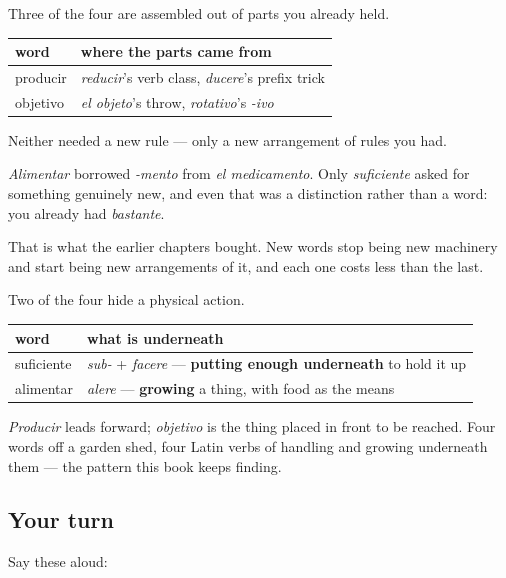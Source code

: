 \begin{grammarlens}[title={Grammar Lens: what this chapter actually cost you}]
Three of the four are assembled out of parts you already held.

\noindent
\begin{tabularx}{\linewidth}{@{}>{\raggedright\arraybackslash}X>{\raggedright\arraybackslash}X@{}}
\toprule
\textbf{word} & \textbf{where the parts came from} \\
\midrule
producir & \emph{reducir}'s verb class, \emph{ducere}'s prefix trick \\
objetivo & \emph{el objeto}'s throw, \emph{rotativo}'s \emph{-ivo} \\
\bottomrule
\end{tabularx}

Neither needed a new rule — only a new arrangement of rules you had.

\emph{Alimentar} borrowed \emph{-mento} from \emph{el medicamento}. Only \emph{suficiente} asked for something genuinely new, and even that was a distinction rather than a word: you already had \emph{bastante}.

That is what the earlier chapters bought. New words stop being new machinery and start being new arrangements of it, and each one costs less than the last.
\end{grammarlens}

\begin{cousinweb}
Two of the four hide a physical action.

\noindent
\begin{tabularx}{\linewidth}{@{}>{\raggedright\arraybackslash}X>{\raggedright\arraybackslash}X@{}}
\toprule
\textbf{word} & \textbf{what is underneath} \\
\midrule
suficiente & \emph{sub-} + \emph{facere} — \textbf{putting enough underneath} to hold it up \\
alimentar & \emph{alere} — \textbf{growing} a thing, with food as the means \\
\bottomrule
\end{tabularx}

\emph{Producir} leads forward; \emph{objetivo} is the thing placed in front to be reached. Four words off a garden shed, four Latin verbs of handling and growing underneath them — the pattern this book keeps finding.
\end{cousinweb}

\subsection*{Your turn}
Say these aloud:

